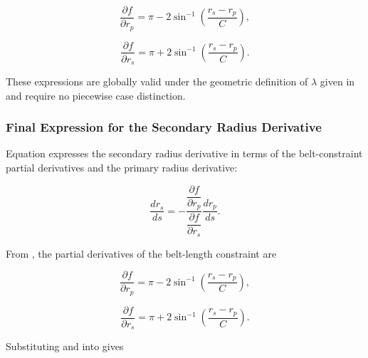 \documentclass[11pt]{article}
\numberwithin{equation}{section}
\begin{document}
\begin{equation}
\frac{\partial f}{\partial r_p}
=
\pi
-
2\sin^{-1}\!\left(\frac{r_s-r_p}{C}\right),
\label{eq:dfdrp_summary}
\end{equation}

\begin{equation}
\frac{\partial f}{\partial r_s}
=
\pi
+
2\sin^{-1}\!\left(\frac{r_s-r_p}{C}\right).
\label{eq:dfdrs_summary}
\end{equation}

These expressions are globally valid under the geometric definition
of $\lambda$ given in  and require no piecewise
case distinction.





\subsubsection{Final Expression for the Secondary Radius Derivative}
\label{sec:drsds_final}

Equation  expresses the secondary radius derivative in
terms of the belt-constraint partial derivatives and the primary radius derivative:

\begin{equation}
\frac{dr_s}{ds}
=
-
\frac{\dfrac{\partial f}{\partial r_p}}
{\dfrac{\partial f}{\partial r_s}}
\frac{dr_p}{ds}.
\label{eq:drsds_recalled}
\end{equation}

From , the partial derivatives of the belt-length constraint
 are

\begin{equation}
\frac{\partial f}{\partial r_p}
=
\pi
-
2\sin^{-1}\!\left(\frac{r_s-r_p}{C}\right),
\label{eq:dfdrp_final_used}
\end{equation}

\begin{equation}
\frac{\partial f}{\partial r_s}
=
\pi
+
2\sin^{-1}\!\left(\frac{r_s-r_p}{C}\right).
\label{eq:dfdrs_final_used}
\end{equation}

Substituting  and  into
 gives
\end{document}
